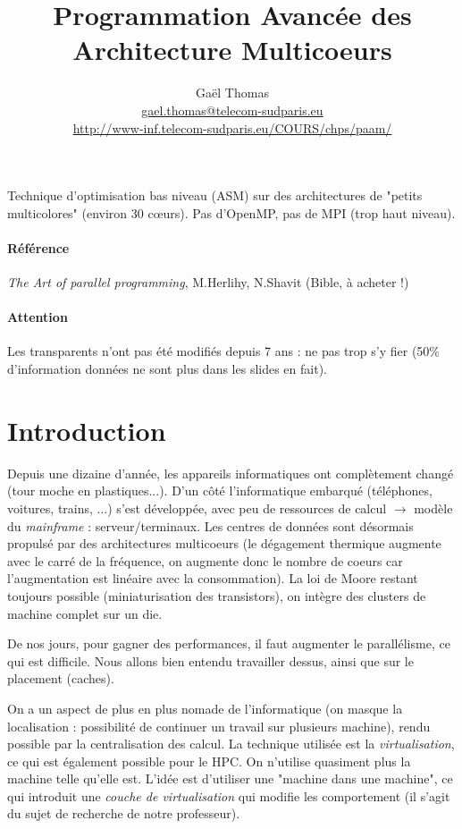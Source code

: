 \documentclass{article}
\title{Programmation Avancée des Architecture Multicoeurs}
\author{Gaël Thomas\\
\url{gael.thomas@telecom-sudparis.eu}\\
\url{http://www-inf.telecom-sudparis.eu/COURS/chps/paam/}}
\date{}
\begin{document}
\maketitle
\tableofcontents
\newpage


Technique d'optimisation bas niveau (ASM) sur des architectures de "petits multicolores" (environ 30 cœurs). Pas d'OpenMP, pas de MPI (trop haut niveau).

\paragraph{Référence} \emph{The Art of parallel programming}, M.Herlihy, N.Shavit (Bible, à acheter !)

\paragraph{Attention} Les transparents n'ont pas été modifiés depuis 7 ans : ne pas trop s'y fier (50\% d'information données ne sont plus dans les slides en fait).

\section{Introduction}
Depuis une dizaine d'année, les appareils informatiques ont complètement changé (tour moche en plastiques...). D'un côté l'informatique embarqué (téléphones, voitures, trains, ...) s'est développée, avec peu de ressources de calcul $\to$ modèle du \emph{mainframe} : serveur/terminaux. Les centres de données sont désormais propulsé par des architectures multicoeurs (le dégagement thermique augmente avec le carré de la fréquence, on augmente donc le nombre de coeurs car l'augmentation est linéaire avec la consommation). La loi de Moore restant toujours possible (miniaturisation des transistors), on intègre des clusters de machine complet sur un die.

De nos jours, pour gagner des performances, il faut augmenter le parallélisme, ce qui est difficile. Nous allons bien entendu travailler dessus, ainsi que sur le placement (caches).

On a un aspect de plus en plus nomade de l'informatique (on masque la localisation : possibilité de continuer un travail sur plusieurs machine), rendu possible par la centralisation des calcul. La technique utilisée est la \emph{virtualisation}, ce qui est également possible pour le HPC. On n'utilise quasiment plus la machine telle qu'elle est. L'idée est d'utiliser une "machine dans une machine", ce qui introduit une \emph{couche de virtualisation} qui modifie les comportement (il s'agit du sujet de recherche de notre professeur).
\end{document}

